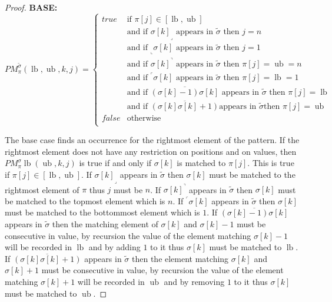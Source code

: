 \documentclass[a4paper]{llncs}
\newcommand{\ptext}{\pi}
\newcommand{\ppattern}{\sigma}
\newcommand{\PM}{PM}
\DeclareMathOperator{\lb}{lb}
\DeclareMathOperator{\ub}{ub}
\begin{document}
\begin{proof}
\noindent\textbf{BASE:} \\
$$
\PM^{\widetilde{\sigma}}_{\ptext}(\lb,\ub,k,j)=
\begin{cases}
	true 	& \text{if $\ptext[j] \in [\lb,\ub ]$}\\
			& \text{and if ${\ppattern[k]}_\lrcorner$ appears in $\widetilde{\sigma}$ then $j=n$}\\
			& \text{and if $_\llcorner{\sigma[k]}$ appears in $\widetilde{\sigma}$ then $j=1$}\\
			& \text{and if ${\ppattern[k]}^\urcorner$ appears in $\widetilde{\sigma}$ then $\ptext[j]=\ub=n$}\\
			& \text{and if  $^\ulcorner{\ppattern[k]}$ appears in $\widetilde{\sigma}$ then $\ptext[j]=\lb=1$ } \\
			& \text{and if  $\overline{(\ppattern[k]-1)\ppattern[k]}$ appears in $\widetilde{\sigma}$ then $\ptext[j]=\lb$ }  \\
			& \text{and if  $\overline{(\ppattern[k]\ppattern[k]+1)}$
			appears in $\widetilde{\sigma}$
			then $\ptext[j]=\ub$}  \\

	false	& \text{otherwise} \\
\end{cases}
$$

The base case finds an occurrence for the rightmost element of the pattern. If the rightmost element does not have any restriction on positions and on values, then $\PM^{\sigma}_{\ptext}{\lb}(\ub,k,j)$ is true if and only if $\ppattern[k]$ is matched to $\ptext[j]$. This is true if $\ptext[j] \in [\lb,\ub]$. If ${\ppattern[k]}_\lrcorner$ appears in $\widetilde{\sigma}$ then $\ppattern[k]$ must be matched to the rightmost element of $\pi$ thus $j$ must be $n$. If ${\ppattern[k]}^\urcorner$ appears in $\widetilde{\sigma}$ then $\ppattern[k]$ must be matched to the topmost element which is $n$. If $^\ulcorner{\ppattern[k]}$ appears in $\widetilde{\sigma}$ then $\ppattern[k]$ must be matched to the bottommost element which is $1$. 
If  $\overline{(\ppattern[k]-1)\ppattern[k] }$ appears in $\widetilde{\sigma}$ then the matching element of $\ppattern[k]$ and $\ppattern[k]-1$ must be consecutive in value, by recursion the value of the element matching $\ppattern[k]-1$ will be recorded in $\lb$ and by adding $1$ to it thus $\ppattern[k]$ must be matched to $\lb$. 
If  $\overline{(\ppattern[k]\ppattern[k]+1)}$ appears in $\widetilde{\sigma}$ then the element matching $\ppattern[k]$ and $\ppattern[k]+1$ must be consecutive in value, by recursion the value of the  element matching $\ppattern[k]+1$ will be recorded in $\ub$ and by removing $1$ to it thus $\ppattern[k]$ must be matched to $\ub$. 



\end{proof}
\end{document}
